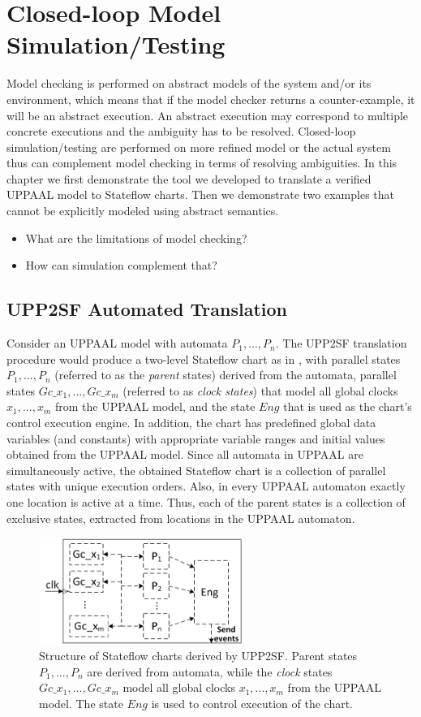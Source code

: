 \chapter{Closed-loop Model Simulation/Testing}
Model checking is performed on abstract models of the system and/or its environment, which means that if the model checker returns a counter-example, it will be an abstract execution. An abstract execution may correspond to multiple concrete executions and the ambiguity has to be resolved. Closed-loop simulation/testing are performed on more refined model or the actual system thus can complement model checking in terms of resolving ambiguities. In this chapter we first demonstrate the tool we developed to translate a verified UPPAAL model to Stateflow charts. Then we demonstrate two examples that cannot be explicitly modeled using abstract semantics.

\begin{itemize}
	\item What are the limitations of model checking?
    \item How can simulation complement that?
\end{itemize}
\section{UPP2SF Automated Translation}
Consider an UPPAAL model with automata $P_1,...,P_n$. The UPP2SF translation procedure would produce a two-level Stateflow chart as in , with parallel states $P_1,...,P_n$ (referred to as the \textit{parent} states) derived from the automata, parallel states $Gc\_{x_1},..., Gc\_{x_m}$ (referred to as \textit{clock states}) that model all global clocks $x_1,...,x_m$ from the UPPAAL model, and the state $Eng$ that is used as the chart's control execution engine.
In addition, the chart has predefined global data variables (and constants) with appropriate variable ranges and initial values obtained from the UPPAAL model. 
Since all automata in UPPAAL are simultaneously active, the obtained Stateflow chart is a collection of parallel states with unique execution orders. Also, in every UPPAAL automaton exactly one location is active at a time. Thus, each of the parent states is a collection of exclusive states, extracted from locations in the UPPAAL automaton.
\begin{figure} [!t]
\center
\includegraphics[width=0.6\textwidth]{figs/chart_GlobalClocks_rev1.png} 
\caption{Structure of Stateflow charts derived by UPP2SF. Parent states $P_1,...,P_n$ are derived from automata, while the \textit{clock} states $Gc\_{x_1},..., Gc\_{x_m}$ model all global clocks $x_1,...,x_m$ from the UPPAAL model. The state $Eng$ is used to control execution of the chart.}
\label{fig:chart}
\end{figure}

